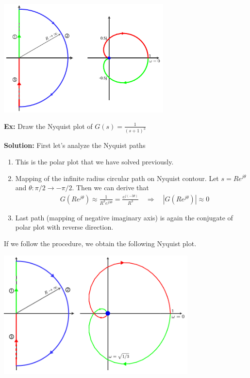 \documentclass{article}
\begin{document}
  \begin{minipage}[h]{1\linewidth}
    \begin{center}
      \includegraphics[width=0.65\textwidth]{ex3}
    \end{center}
  \end{minipage}

\vspace{12 pt}

\textbf{Ex:} Draw the Nyquist plot of $G(s) =
\frac{1}{(s+1)^3}$ 

\textbf{Solution:} First let's analyze the Nyquist paths
%
\begin{enumerate}

  \item This is the polar plot that we have solved previously. 
  \item Mapping of the infinite radius circular path on
    Nyquist contour. Let $s = R e^{j \theta}$ and $\theta : \pi/2 \to -\pi/2$.  Then 
   we can derive that  
   \begin{align*}
     & G \left( R e^{j \theta} \right) \approx \frac{1}{R^3 e^{j
       3 \theta}} = \frac{e^{j (-3 \theta)}}{R^3}
	\quad
    \Rightarrow  \quad | G \left( R e^{j \theta} \right) | \approx 0
   \end{align*}
   \item Last path (mapping of negative imaginary axis) is again
   the conjugate of polar plot with reverse direction. 
\end{enumerate}

If we follow the procedure, we obtain the following Nyquist plot. 

\vspace{6 pt}

  \begin{minipage}[h]{1\linewidth}
    \begin{center}
      \includegraphics[width=0.75\textwidth]{ex4}
    \end{center}
  \end{minipage}
\end{document}
